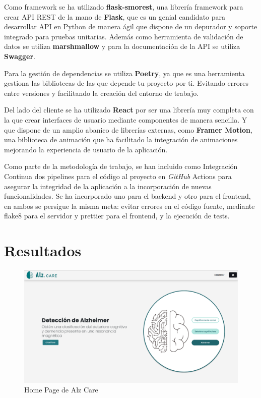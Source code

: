 Como framework se ha utilizado \textbf{flask-smorest}, una librería framework para crear API REST de la mano de
\textbf{Flask}, que es un genial candidato para desarrollar API en Python de manera ágil que dispone de un depurador
y soporte integrado para pruebas unitarias.
Además como herramienta de validación de datos se utiliza \textbf{marshmallow} y para la documentación de la API se utiliza
\textbf{Swagger}.

Para la gestión de dependencias se utiliza \textbf{Poetry}, ya que es una herramienta gestiona las bibliotecas de las que depende
tu proyecto por ti.
Evitando errores entre versiones y facilitando la creación del entorno de trabajo.

Del lado del cliente se ha utilizado \textbf{React} por ser una librería muy completa con la que crear interfaces de usuario
mediante componentes de manera sencilla.
Y que dispone de un amplio abanico de librerías externas, como \textbf{Framer Motion}, una biblioteca de animación que ha
facilitado la integración de animaciones mejorando la experiencia de usuario de la aplicación.

Como parte de la metodología de trabajo, se han incluido como Integración Continua dos pipelines para el código al
proyecto en \textit{GitHub} Actions para asegurar la integridad de la aplicación a la incorporación de nuevas funcionalidades.
Se ha incorporado uno para el backend y otro para el frontend, en ambos se persigue la misma meta: evitar errores en
el código fuente, mediante flake8 para el servidor y prettier para el frontend, y la ejecución de tests.


\section{Resultados}\label{sec:resultados}

\begin{figure}[H]
    \centering
    \includegraphics[width=\textwidth]{./imgs/app/final-home}
    \caption{Home Page de Alz Care}
    \label{fig:home-page}
\end{figure}

